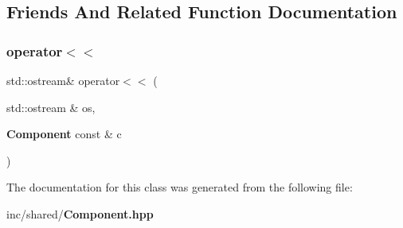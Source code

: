 \subsection{Friends And Related Function Documentation}
\label{classentity__component__system_1_1component_1_1_component_a4e20c5bd6ea119cc25cb04d2610e0653} 
\subsubsection{operator$<$$<$}
{\footnotesize\ttfamily std\+::ostream\& operator$<$$<$ (\begin{DoxyParamCaption}\item[{std\+::ostream \&}]{os,  }\item[{{\bf Component} const \&}]{c }\end{DoxyParamCaption})\hspace{0.3cm}{\ttfamily [friend]}}



The documentation for this class was generated from the following file\+:\begin{DoxyCompactItemize}
\item 
inc/shared/{\bf Component.\+hpp}\end{DoxyCompactItemize}
